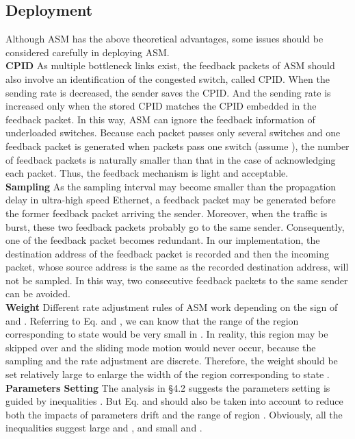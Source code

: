 \documentclass{sig-alternate-10pt}
\begin{document}
\subsection{Deployment}
Although ASM has the above theoretical advantages, some issues should be considered carefully in deploying ASM. \\
\textbf{CPID}
As multiple bottleneck links exist, the feedback packets of ASM should also involve an identification of the congested switch, called CPID. When the sending rate is decreased, the sender saves the CPID. And the sending rate is increased only when the stored CPID matches the CPID embedded in the feedback packet. In this way, ASM can ignore the feedback information of underloaded switches. Because each packet passes only several switches and one feedback packet is generated when  packets pass one switch (assume ), the number of feedback packets is naturally smaller than that in the case of acknowledging each packet. Thus, the feedback mechanism is light and acceptable.\\
\textbf{Sampling}
As the sampling interval may become smaller than the propagation delay in ultra-high speed Ethernet, a feedback packet may be generated before the former feedback packet arriving the sender. Moreover, when the traffic is burst, these two feedback packets probably go to the same sender. Consequently, one of the feedback packet becomes redundant. In our implementation, the destination address of the feedback packet is recorded and then the incoming packet, whose source address is the same as the recorded destination address, will not be sampled. In this way, two consecutive feedback packets to the same sender can be avoided. \\
\textbf{Weight}
Different rate adjustment rules of ASM work depending on the sign of  and . Referring to Eq.  and , we can know that the range of the region corresponding to state  would be very small in . In reality, this region may be skipped over and the sliding mode motion would never occur, because the sampling and the rate adjustment are discrete. Therefore, the weight  should be set relatively large to enlarge the width of the region corresponding to state .\\
\textbf{Parameters Setting} The analysis in \S4.2 suggests the parameters setting is guided by inequalities . But Eq.  and  should also be taken into account to reduce both the impacts of parameters drift and the range of region . Obviously, all the inequalities suggest large  and , and small  and .
\end{document}
